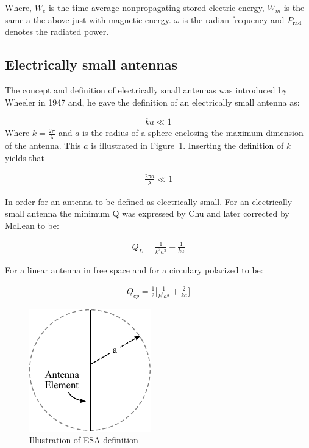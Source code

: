 Where, $W_e$ is the time-average nonpropagating stored electric energy, $W_m$ is the same a the above just with magnetic energy. $\omega$ is the radian frequency and $P_{\text{rad}}$ denotes the radiated power.

\subsection{Electrically small antennas}
The concept and definition of electrically small antennas was introduced by Wheeler in 1947 and, he gave the definition of an electrically small antenna as:

\begin{align}
\label{eq:esa-def}
  ka \ll 1 
\end{align}
Where $k = \frac{2\pi}{\lambda}$ and $a$ is the radius of a sphere enclosing the maximum dimension of the antenna. This $a$ is illustrated in Figure~\ref{fig:ant-esa-def}. Inserting the definition of $k$ yields that

\begin{align}
  \frac{2\pi a}{\lambda} \ll 1
\end{align}

In order for an antenna to be defined as electrically small. For an electrically small antenna the minimum Q was expressed by Chu and later corrected by McLean to be:  

\begin{align}
  Q_L = \frac{1}{k^3a^3}+ \frac{1}{ka}
\end{align}

For a linear antenna in free space and for a circulary polarized to be: 

\begin{align}
  Q_{cp} = \frac{1}{2} \Big[ \frac{1}{k^3a^3} + \frac{2}{ka} \Big]
\end{align}


\begin{figure}[htbp]
  \centering
  \includegraphics[scale=1]{img/analysis/ESA}
  \caption{Illustration of ESA definition}
  \label{fig:ant-esa-def}
\end{figure}

